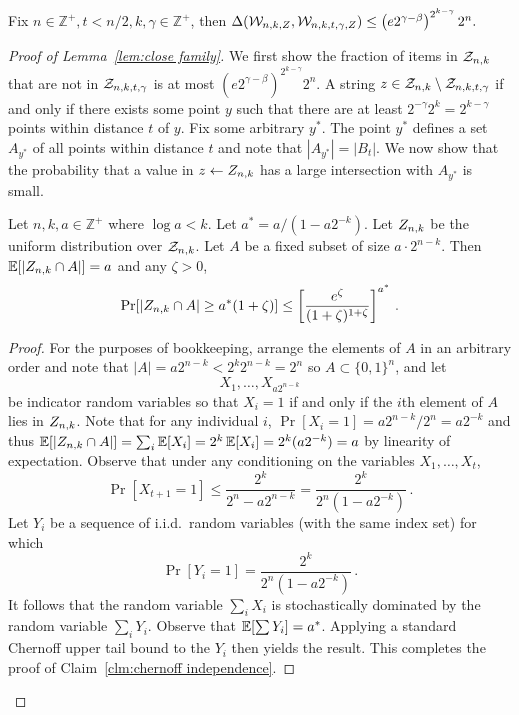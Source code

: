 

 \begin{lemma}
 \label{lem:close family}
Fix $n\in \mathbb{Z}^+, t<n/2, k, \gamma  \in \mathbb{Z}^+$, then
$\Delta(\mathcal{W}_{n,k, Z}, \mathcal{W}_{n,k,t,\gamma, Z}) \le \left(e2^{\gamma-\beta}\right)^{2^{k-\gamma}}2^n.$
\end{lemma}

\begin{proof}[Proof of Lemma~\ref{lem:close family}]
We first show the fraction of items in $\mathcal{Z}_{n,k}$ that are not in $\mathcal{Z}_{n,k,t,\gamma}$ is at most $\left(e2^{\gamma-\beta}\right)^{2^{k-\gamma}}2^n$.  
A string $z\in \mathcal{Z}_{n,k}\setminus \mathcal{Z}_{n,k,t,\gamma}$ if and only if there exists some point $y$ such that there are at least $2^{-\gamma}2^k = 2^{k-\gamma}$ points within distance $t$ of $y$.  Fix some arbitrary $y^*$. The point $y^*$ defines a set $A_{y^*}$ of all points within distance $t$ and note that $|A_{y^*}| = |B_t|$.  We now show that the probability that a value in $z\leftarrow Z_{n,k}$ has a large intersection with $A_{y^*}$ is small.  

  \begin{claim}
  \label{clm:chernoff independence}
  Let $n,k,a\in\mathbb{Z}^+$ where $\log a < k$.  Let $a^* = a/(1 - a2^{-k})$. Let $Z_{n,k}$
  be the uniform distribution over $\mathcal{Z}_{n,k}$. Let $A$ be a fixed subset of size $a \cdot 2^{n-k}$. Then
  $\operatorname*{\mathbb{E}}[|Z_{n,k} \cap A|] = a$ and any $\zeta > 0$,
  \[
    \Pr[|Z_{n,k} \cap A| \geq a^*(1 + \zeta)] \leq \left[\frac{e^\zeta}{(1+\zeta)^{1+\zeta}}\right]^{a^*}\,.
  \]
\end{claim}
\begin{proof}
  For the purposes of bookkeeping, arrange the elements of $A$ in an
  arbitrary order and note that $|A| = a2^{n-k} < 2^k2^{n-k} = 2^n$ so $A\subset \{0,1\}^n$, and let
  \[
    X_1, \ldots, X_{a2^{n-k}}
  \]
  be indicator random variables so that $X_i = 1$ if and only if the
  $i$th element of $A$ lies in $Z_{n,k}$.  Note that for any individual $i$, $\Pr[X_i =1] =a2^{n-k}/2^n = a2^{-k}$ and thus $\operatorname*{\mathbb{E}}[|Z_{n,k}\cap A|] =\sum_i \operatorname*{\mathbb{E}}[X_i] = 2^k \operatorname*{\mathbb{E}}[X_i] =2^k (a2^{-k})= a$ by linearity of expectation.  Observe that under any conditioning on the
  variables $X_1, \ldots, X_t$,
  \[
    \Pr[X_{t+1} = 1] \leq \frac{2^k}{2^n - a2^{n-k}} = \frac{2^k}{2^n(1 - a2^{-k})}\,.
  \]
   Let $Y_i$ be a sequence of
  i.i.d.\ random variables (with the same index set) for which
  \[
    \Pr[Y_i = 1] = \frac{2^{k}}{2^n(1 - a2^{-k})}\,.
  \]It follows that the random variable $\sum_i X_i$ is stochastically
  dominated by the random variable $\sum_i Y_i$. Observe that
  $\operatorname*{\mathbb{E}}[\sum Y_i] = a^*$. Applying a standard Chernoff upper tail
  bound to the $Y_i$ then yields the result. This completes the proof of Claim~\ref{clm:chernoff independence}.
\end{proof}


\end{proof}
